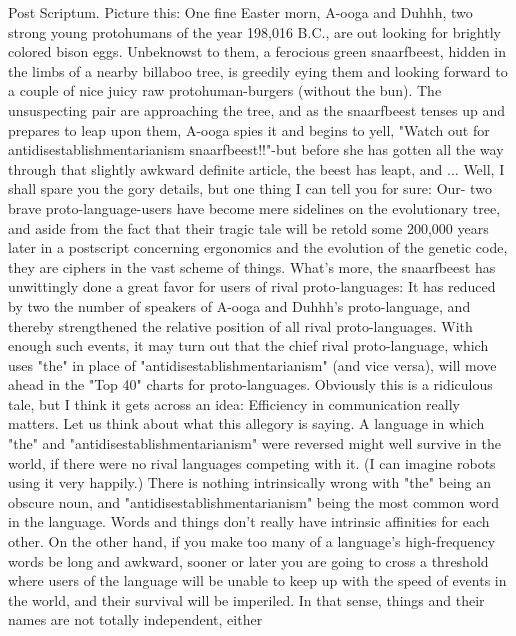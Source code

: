 Post Scriptum.
         Picture this: One fine Easter morn, A-ooga and Duhhh, two strong young
protohumans of the year 198,016 B.C., are out looking for brightly colored bison
eggs. Unbeknowst to them, a ferocious green snaarfbeest, hidden in the limbs of a
nearby billaboo tree, is greedily eying them and looking forward to a couple of nice
juicy raw protohuman-burgers (without the bun). The unsuspecting pair are
approaching the tree, and as the snaarfbeest tenses up and prepares to leap upon them,
A-ooga spies it and begins to yell, "Watch out for antidisestablishmentarianism
snaarfbeest!!"-but before she has gotten all the way through that slightly awkward
definite article, the beest has leapt, and ...
         Well, I shall spare you the gory details, but one thing I can tell you for sure:
Our- two brave proto-language-users have become mere sidelines on the evolutionary
tree, and aside from the fact that their tragic tale will be retold some 200,000 years
later in a postscript concerning ergonomics and the evolution of the genetic code, they
are ciphers in the vast scheme of things. What's more, the snaarfbeest has unwittingly
done a great favor for users of rival proto-languages: It has reduced by two the
number of speakers of A-ooga and Duhhh's proto-language, and thereby strengthened
the relative position of all rival proto-languages. With enough such events, it may turn
out that the chief rival proto-language, which uses "the" in place of
"antidisestablishmentarianism" (and vice versa), will move ahead in the "Top 40"
charts for proto-languages.
         Obviously this is a ridiculous tale, but I think it gets across an idea: Efficiency
in communication really matters. Let us think about what this allegory is saying. A
language in which "the" and "antidisestablishmentarianism" were reversed might well
survive in the world, if there were no rival languages competing with it. (I can
imagine robots using it very happily.) There is nothing intrinsically wrong with "the"
being an obscure noun, and "antidisestablishmentarianism" being the most common
word in the language. Words and things don't really have intrinsic affinities for each
other. On the other hand, if you make too many of a language's high-frequency words
be long and awkward, sooner or later you are going to cross a threshold where users
of the language will be unable to keep up with the speed of events in the world, and
their survival will be imperiled. In that sense, things and their names are not totally
independent, either




